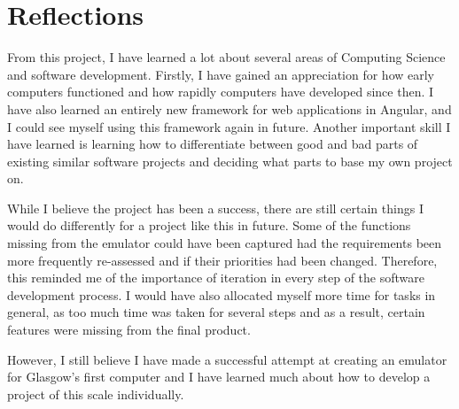 \documentclass{l4proj}
\begin{document}
\section{Reflections}
From this project, I have learned a lot about several areas of Computing Science and software development. Firstly, I have gained an appreciation for how early computers functioned and how rapidly computers have developed since then. I have also learned an entirely new framework for web applications in Angular, and I could see myself using this framework again in future. Another important skill I have learned is learning how to differentiate between good and bad parts of existing similar software projects and deciding what parts to base my own project on.

While I believe the project has been a success, there are still certain things I would do differently for a project like this in future. Some of the functions missing from the emulator could have been captured had the requirements been more frequently re-assessed and if their priorities had been changed. Therefore, this reminded me of the importance of iteration in every step of the software development process. I would have also allocated myself more time for tasks in general, as too much time was taken for several steps and as a result, certain features were missing from the final product.

However, I still believe I have made a successful attempt at creating an emulator for Glasgow's first computer and I have learned much about how to develop a project of this scale individually. 


%
% 
\end{document}
